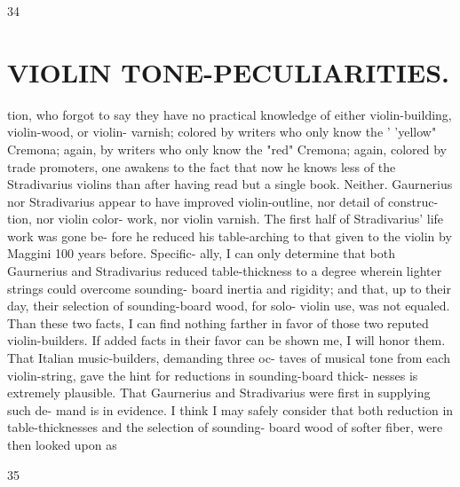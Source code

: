 \documentclass{article}
\begin{document}
34

\section*{VIOLIN TONE-PECULIARITIES.}
tion, who forgot to say they have no practical knowledge of either violin-building, violin-wood, or violin- varnish; colored by writers who only know the ' 'yellow" Cremona; again, by writers who only know the "red" Cremona; again, colored by trade promoters, one awakens to the fact that now he knows less of the Stradivarius violins than after having read but a single book. Neither. Gaurnerius nor Stradivarius appear to have improved violin-outline, nor detail of construc- tion, nor violin color- work, nor violin varnish. The first half of Stradivarius' life work was gone be- fore he reduced his table-arching to that given to the violin by Maggini 100 years before. Specific- ally, I can only determine that both Gaurnerius and Stradivarius reduced table-thickness to a degree wherein lighter strings could overcome sounding- board inertia and rigidity; and that, up to their day, their selection of sounding-board wood, for solo- violin use, was not equaled. Than these two facts, I can find nothing farther in favor of those two reputed violin-builders. If added facts in their favor can be shown me, I will honor them. That Italian music-builders, demanding three oc- taves of musical tone from each violin-string, gave the hint for reductions in sounding-board thick- nesses is extremely plausible. That Gaurnerius and Stradivarius were first in supplying such de- mand is in evidence. I think I may safely consider that both reduction in table-thicknesses and the selection of sounding- board wood of softer fiber, were then looked upon as

35
\end{document}
